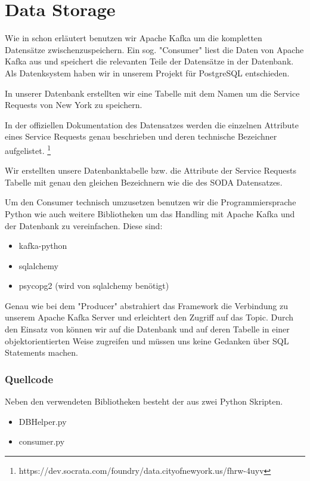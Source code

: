 \section{Data Storage}

Wie in  schon erläutert benutzen wir Apache Kafka um die kompletten Datensätze zwischenzuspeichern.
Ein sog. "Consumer" liest die Daten von Apache Kafka aus und speichert die relevanten Teile der Datensätze in der Datenbank.
Als Datenksystem haben wir in unserem Projekt für PostgreSQL entschieden.

In unserer Datenbank erstellten wir eine Tabelle mit dem Namen  um die Service Requests von New York zu speichern.

In der offiziellen Dokumentation des Datensatzes werden die einzelnen Attribute
eines Service Requests genau beschrieben und deren technische Bezeichner aufgelistet.
\footnote{https://dev.socrata.com/foundry/data.cityofnewyork.us/fhrw-4uyv}

Wir erstellten unsere Datenbanktabelle bzw. die Attribute der Service Requests Tabelle mit
genau den gleichen Bezeichnern wie die des \ac{SODA} Datensatzes.

Um den Consumer technisch umzusetzen benutzen wir die Programmiersprache Python wie auch weitere Bibliotheken um das Handling mit Apache Kafka
und der Datenbank zu vereinfachen.
Diese sind:

\begin{itemize}
  \item kafka-python
  \item sqlalchemy
  \item psycopg2 (wird von sqlalchemy benötigt)
\end{itemize}

Genau wie bei dem "Producer" abstrahiert das Framework  die Verbindung zu unserem Apache Kafka Server und erleichtert den Zugriff auf das Topic.
Durch den Einsatz von  können wir auf die Datenbank und auf deren Tabelle in einer objektorientierten Weise zugreifen
und müssen uns keine Gedanken über SQL Statements machen.

\subsubsection{Quellcode}
\label{subsub:quellcode_storage}
Neben den verwendeten Bibliotheken besteht der  aus zwei Python Skripten.

\begin{itemize}
  \item DBHelper.py
  \item consumer.py
\end{itemize}


